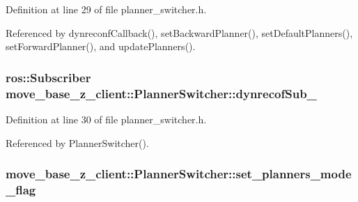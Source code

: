 Definition at line 29 of file planner\+\_\+switcher.\+h.



Referenced by dynreconf\+Callback(), set\+Backward\+Planner(), set\+Default\+Planners(), set\+Forward\+Planner(), and update\+Planners().

\subsubsection[{\texorpdfstring{dynrecof\+Sub\+\_\+}{dynrecofSub_}}]{\setlength{\rightskip}{0pt plus 5cm}ros\+::\+Subscriber move\+\_\+base\+\_\+z\+\_\+client\+::\+Planner\+Switcher\+::dynrecof\+Sub\+\_\+\hspace{0.3cm}{\ttfamily [private]}}\hypertarget{classmove__base__z__client_1_1PlannerSwitcher_a088bde4ce0fece46776a9f4efe417e15}{}\label{classmove__base__z__client_1_1PlannerSwitcher_a088bde4ce0fece46776a9f4efe417e15}


Definition at line 30 of file planner\+\_\+switcher.\+h.



Referenced by Planner\+Switcher().

\subsubsection[{\texorpdfstring{set\+\_\+planners\+\_\+mode\+\_\+flag}{set_planners_mode_flag}}]{ move\+\_\+base\+\_\+z\+\_\+client\+::\+Planner\+Switcher\+::set\+\_\+planners\+\_\+mode\+\_\+flag\hspace{0.3cm}{\ttfamily [private]}}\hypertarget{classmove__base__z__client_1_1PlannerSwitcher_a74c0b5c21064a868700288e759446ac5}{}\label{classmove__base__z__client_1_1PlannerSwitcher_a74c0b5c21064a868700288e759446ac5}


